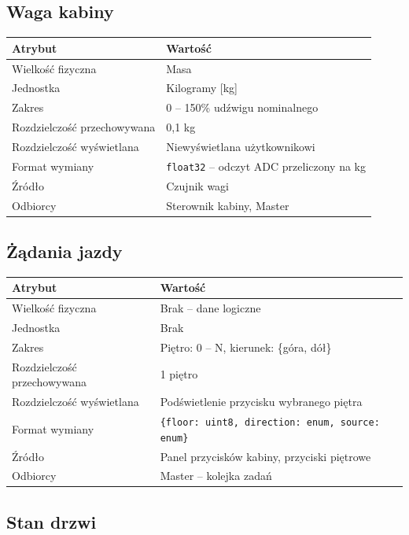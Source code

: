 \documentclass[12pt,a4paper]{article}
\begin{document}
\subsection{Waga kabiny}

\begin{tabularx}{\textwidth}{lX}
\toprule
\textbf{Atrybut} & \textbf{Wartość} \\
\midrule
Wielkość fizyczna & Masa \\
Jednostka & Kilogramy [kg] \\
Zakres & 0 -- 150\% udźwigu nominalnego \\
Rozdzielczość przechowywana & 0,1 kg \\
Rozdzielczość wyświetlana & Niewyświetlana użytkownikowi \\
Format wymiany & \texttt{float32} -- odczyt ADC przeliczony na kg \\
Źródło & Czujnik wagi \\
Odbiorcy & Sterownik kabiny, Master \\
\bottomrule
\end{tabularx}

\subsection{Żądania jazdy}

\begin{tabularx}{\textwidth}{lX}
\toprule
\textbf{Atrybut} & \textbf{Wartość} \\
\midrule
Wielkość fizyczna & Brak -- dane logiczne \\
Jednostka & Brak \\
Zakres & Piętro: 0 -- N, kierunek: \{góra, dół\} \\
Rozdzielczość przechowywana & 1 piętro \\
Rozdzielczość wyświetlana & Podświetlenie przycisku wybranego piętra \\
Format wymiany & \texttt{\{floor: uint8, direction: enum, source: enum\}} \\
Źródło & Panel przycisków kabiny, przyciski piętrowe \\
Odbiorcy & Master -- kolejka zadań \\
\bottomrule
\end{tabularx}

\subsection{Stan drzwi}
\end{document}

